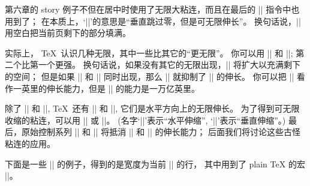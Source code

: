 第六章的 story 例子不但在居中时使用了无限大粘连，而且在最后的 |\vfill| 指令中也用到了；
在本质上，`|\vfill|'的意思是``垂直跳过零，但是可无限伸长''。%
换句话说，|\vfill| 用空白把当前页剩下的部分填满。

\danger 实际上， \TeX\ 认识几种无限，其中一些比其它的``更无限''。%
你可以用 |\vfil| 和 |\vfill|;
第二个比第一个更强。%
换句话说，如果没有其它的无限出现，|\vfill| 将扩大以充满剩下的空间；
但是如果 |\vfil| 和 |\vfill| 同时出现，那么 |\vfill| 就抑制了 |\vfil| 的伸长。%
你可以把 |\vfil| 看作一英里的伸长能力，但是 |\vfill| 的能力是一万亿英里。

\danger 除了 |\vfil| 和 |\vfill|, \TeX\ 还有 |\hfil| 和 |\hfill|,
它们是水平方向上的无限伸长。%
为了得到可无限收缩的粘连，可以用 |\hss| 或 |\vss|。%
(名字`|\hss|'表示``水平伸缩'', `|\vss|'表示``垂直伸缩''。)
最后，原始控制系列 |\hfilneg| 和 |\vfilneg| 将抵消 |\hfil| 和 |\vfil| 的伸长能力；
\1后面我们将讨论这些古怪粘连的应用。

\danger 下面是一些 |\hfil| 的例子，得到的是宽度为当前 |\hsize| 的行，
其中用到了 plain TeX 的宏 |\line|。
\begintt
{}
\endtt

